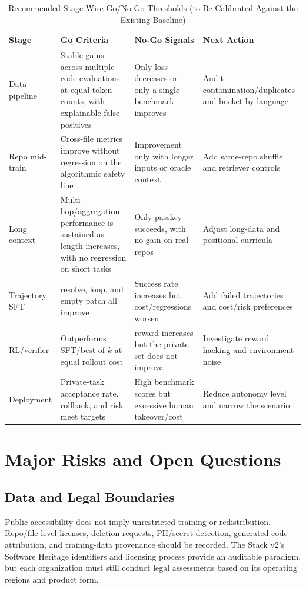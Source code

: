 \documentclass[10pt,a4paper,UTF8,fontset=none]{ctexart}
\begin{document}
\begin{table}[htbp]
\centering
\caption{Recommended Stage-Wise Go/No-Go Thresholds (to Be Calibrated Against the Existing Baseline)}
\label{tab:gates}
\small
\begin{tabularx}{\textwidth}{p{2.5cm}YYp{3.2cm}}
\toprule
Stage & Go Criteria & No-Go Signals & Next Action \\
\midrule
Data pipeline & Stable gains across multiple code evaluations at equal token counts, with explainable false positives & Only loss decreases or only a single benchmark improves & Audit contamination/duplicates and bucket by language \\
Repo mid-train & Cross-file metrics improve without regression on the algorithmic safety line & Improvement only with longer inputs or oracle context & Add same-repo shuffle and retriever controls \\
Long context & Multi-hop/aggregation performance is sustained as length increases, with no regression on short tasks & Only passkey succeeds, with no gain on real repos & Adjust long-data and positional curricula \\
Trajectory SFT & resolve, loop, and empty patch all improve & Success rate increases but cost/regressions worsen & Add failed trajectories and cost/risk preferences \\
RL/verifier & Outperforms SFT/best-of-$k$ at equal rollout cost & reward increases but the private set does not improve & Investigate reward hacking and environment noise \\
Deployment & Private-task acceptance rate, rollback, and risk meet targets & High benchmark scores but excessive human takeover/cost & Reduce autonomy level and narrow the scenario \\
\bottomrule
\end{tabularx}
\end{table}

\section{Major Risks and Open Questions}

\subsection{Data and Legal Boundaries}

Public accessibility does not imply unrestricted training or redistribution. Repo/file-level licenses, deletion requests, PII/secret detection, generated-code attribution, and training-data provenance should be recorded. The Stack v2's Software Heritage identifiers and licensing process provide an auditable paradigm\cite{lozhkov2024starcoder2}, but each organization must still conduct legal assessments based on its operating regions and product form.
\end{document}
